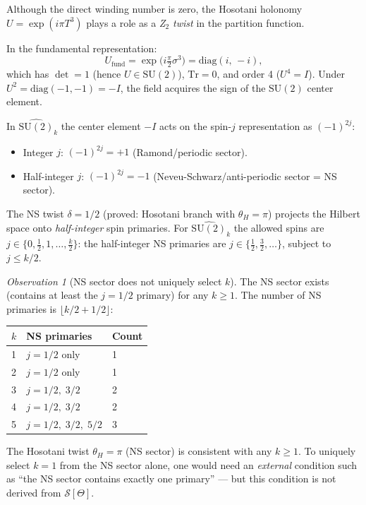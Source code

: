 \documentclass[11pt,a4paper]{article}
\theoremstyle{definition}
\theoremstyle{remark}
\newtheorem{observation}{Observation}
\begin{document}
Although the direct winding number is zero, the Hosotani holonomy
$U = \exp(i\pi T^3)$ plays a role as a \emph{Z$_2$ twist} in the
partition function.

In the fundamental representation:
\begin{equation}
  U_{\mathrm{fund}} = \exp\!\bigl(i\tfrac{\pi}{2}\sigma^3\bigr)
  = \mathrm{diag}(i,\,-i),
  \label{eq:U_fund}
\end{equation}
which has $\det = 1$ (hence $U \in \mathrm{SU}(2)$), $\mathrm{Tr} = 0$,
and order 4 ($U^4 = I$).  Under $U^2 = \mathrm{diag}(-1,-1) = -I$,
the field acquires the sign of the $\mathrm{SU}(2)$ center element.

In $\widehat{\mathrm{SU}(2)}_k$ the center element $-I$ acts on the
spin-$j$ representation as $(-1)^{2j}$:
\begin{itemize}
  \item Integer $j$: $(-1)^{2j} = +1$ (Ramond/periodic sector).
  \item Half-integer $j$: $(-1)^{2j} = -1$ (Neveu-Schwarz/anti-periodic
    sector = NS sector).
\end{itemize}
The NS twist $\delta = 1/2$ (proved: Hosotani branch with $\theta_H = \pi$)
projects the Hilbert space onto \emph{half-integer} spin primaries.
For $\widehat{\mathrm{SU}(2)}_k$ the allowed spins are
$j \in \{0, \tfrac{1}{2}, 1, \ldots, \tfrac{k}{2}\}$:
the half-integer NS primaries are $j \in \{\tfrac{1}{2}, \tfrac{3}{2},
\ldots\}$, subject to $j \leq k/2$.

\begin{observation}[NS sector does not uniquely select $k$]
  \label{obs:I2_NS}
  The NS sector exists (contains at least the $j = 1/2$ primary) for
  any $k \geq 1$.  The number of NS primaries is $\lfloor k/2 + 1/2 \rfloor$:
  \begin{center}
  \begin{tabular}{lll}
    \toprule
    $k$ & NS primaries & Count \\
    \midrule
    1 & $j = 1/2$ only & 1 \\
    2 & $j = 1/2$ only & 1 \\
    3 & $j = 1/2,\;3/2$ & 2 \\
    4 & $j = 1/2,\;3/2$ & 2 \\
    5 & $j = 1/2,\;3/2,\;5/2$ & 3 \\
    \bottomrule
  \end{tabular}
  \end{center}
  The Hosotani twist $\theta_H = \pi$ (NS sector) is consistent with any
  $k \geq 1$.  To uniquely select $k = 1$ from the NS sector alone, one
  would need an \emph{external} condition such as
  ``the NS sector contains exactly one primary'' — but this condition
  is not derived from $\mathcal{S}[\Theta]$.
\end{observation}
\end{document}
